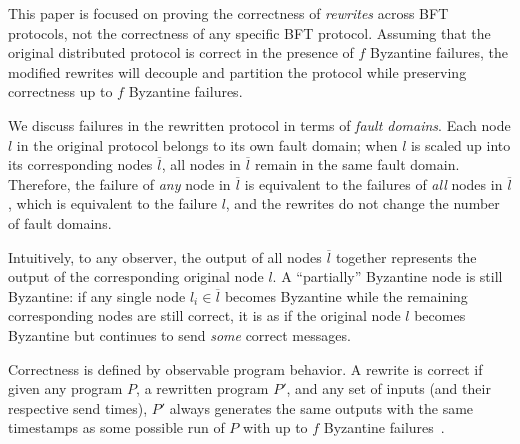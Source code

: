 This paper is focused on proving the correctness of \emph{rewrites} across BFT protocols, not the correctness of any specific BFT protocol.
Assuming that the original distributed protocol is correct in the presence of $f$ Byzantine failures, the modified rewrites will decouple and partition the protocol while preserving correctness up to $f$ Byzantine failures.

We discuss failures in the rewritten protocol in terms of \emph{fault domains}.
Each node $l$ in the original protocol belongs to its own fault domain; when $l$ is scaled up into its corresponding nodes $\overline{l}$, all nodes in $\overline{l}$ remain in the same fault domain.
Therefore, the failure of \emph{any} node in $\overline{l}$ is equivalent to the failures of \emph{all} nodes in $\overline{l}$, which is equivalent to the failure $l$, and the rewrites do not change the number of fault domains.

Intuitively, to any observer, the output of all nodes $\overline{l}$ together represents the output of the corresponding original node $l$.
A ``partially'' Byzantine node is still Byzantine: if any single node $l_i \in \overline{l}$ becomes Byzantine while the remaining corresponding nodes are still correct, it is as if the original node $l$ becomes Byzantine but continues to send \textit{some} correct messages.

Correctness is defined by observable program behavior.
A rewrite is correct if given any program $P$, a rewritten program $P'$, and any set of inputs (and their respective send times), $P'$ always generates the same outputs with the same timestamps as some possible run of $P$ with up to $f$ Byzantine failures~\cite{autocomp}.


